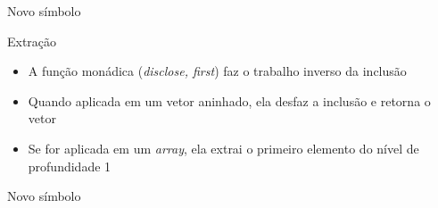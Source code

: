\begin{frame}[fragile]{Novo símbolo}


\end{frame}

\begin{frame}[fragile]{Extração}

    \begin{itemize}
        \item A função monádica  (\textit{disclose, first}) faz o trabalho inverso da inclusão

        \item Quando aplicada em um vetor aninhado, ela desfaz a inclusão e retorna o vetor

        \item Se for aplicada em um \textit{array}, ela extrai o primeiro elemento do nível de profundidade 1
    \end{itemize}

\end{frame}

\begin{frame}[fragile]{Novo símbolo}


\end{frame}


